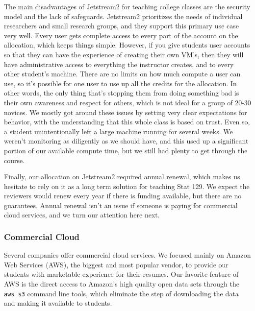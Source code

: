 \documentclass[12pt]{article}
\begin{document}
The main disadvantages of Jetstream2 for teaching college classes are the security model and the lack of safeguards.
Jetstream2 prioritizes the needs of individual researchers and small research groups, and they support this primary use case very well.
Every user gets complete access to every part of the account on the allocation, which keeps things simple.
However, if you give students user accounts so that they can have the experience of creating their own VM's, then they will have administrative access to everything the instructor creates, and to every other student's machine.
There are no limits on how much compute a user can use, so it's possible for one user to use up all the credits for the allocation.
In other words, the only thing that's stopping them from doing something bad is their own awareness and respect for others, which is not ideal for a group of 20-30 novices.
We mostly got around these issues by setting very clear expectations for behavior, with the understanding that this whole class is based on trust.
Even so, a student unintentionally left a large machine running for several weeks.
We weren't monitoring as diligently as we should have, and this used up a significant portion of our available compute time, but we still had plenty to get through the course.

Finally, our allocation on Jetstream2 required annual renewal, which makes us hesitate to rely on it as a long term solution for teaching Stat 129.
We expect the reviewers would renew every year if there is funding available, but there are no guarantees.
Annual renewal isn't an issue if someone is paying for commercial cloud services, and we turn our attention here next.


\subsubsection{Commercial Cloud}
\label{sec:comcloud}

Several companies offer commercial cloud services.
We focused mainly on Amazon Web Services (AWS), the biggest and most popular vendor, to provide our students with marketable experience for their resumes.
Our favorite feature of AWS is the direct access to Amazon's high quality open data sets through the \texttt{aws s3} command line tools, which eliminate the step of downloading the data and making it available to students.
\end{document}

